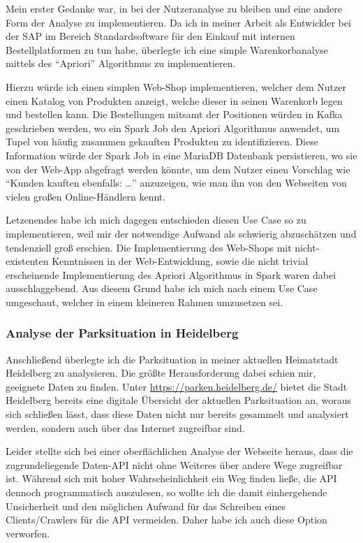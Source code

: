 Mein erster Gedanke war, in bei der Nutzeranalyse zu bleiben und eine andere Form der Analyse zu implementieren.
Da ich in meiner Arbeit als Entwickler bei der SAP im Bereich Standardsoftware für den Einkauf mit internen Bestellplatformen zu tun habe, überlegte ich eine simple Warenkorbanalyse mittels des \enquote{Apriori} Algorithmus zu implementieren.
\parencite{agrawal_fast_1994}

Hierzu würde ich einen simplen Web-Shop implementieren, welcher dem Nutzer einen Katalog von Produkten anzeigt, welche dieser in seinen Warenkorb legen und bestellen kann.
Die Bestellungen mitsamt der Positionen würden in Kafka geschrieben werden, wo ein Spark Job den Apriori Algorithmus anwendet, um Tupel von häufig zusammen gekauften Produkten zu identifizieren.
Diese Information würde der Spark Job in eine MariaDB Datenbank persistieren, wo sie von der Web-App abgefragt werden könnte, um dem Nutzer einen Vorschlag wie \enquote{Kunden kauften ebenfalls:  \ldots} anzuzeigen, wie man ihn von den Webseiten von vielen großen Online-Händlern kennt.

Letzenendes habe ich mich dagegen entschieden diesen Use Case so zu implementieren, weil mir der notwendige Aufwand als schwierig abzuschätzen und tendenziell groß erschien.
Die Implementierung des Web-Shops mit nicht-existenten Kenntnissen in der Web-Entwicklung, sowie die nicht trivial erscheinende Implementierung des Apriori Algorithmus in Spark waren dabei ausschlaggebend.
Aus diesem Grund habe ich mich nach einem Use Case umgeschaut, welcher in einem kleineren Rahmen umzusetzen sei.

\subsubsection{Analyse der Parksituation in Heidelberg}

Anschließend überlegte ich die Parksituation in meiner aktuellen Heimatstadt Heidelberg zu analysieren.
Die größte Herausforderung dabei schien mir, geeignete Daten zu finden.
Unter \url{https://parken.heidelberg.de/} bietet die Stadt Heidelberg bereits eine digitale Übersicht der aktuellen Parksituation an, woraus sich schließen lässt, dass diese Daten nicht nur bereits gesammelt und analysiert werden, sondern auch über das Internet zugreifbar sind.

Leider stellte sich bei einer oberflächlichen Analyse der Webseite heraus, dass die zugrundeliegende Daten-API nicht ohne Weiteres über andere Wege zugreifbar ist.
Während sich mit hoher Wahrscheinlichkeit ein Weg finden ließe, die API dennoch programmatisch auszulesen, so wollte ich die damit einhergehende Unsicherheit und den möglichen Aufwand für das Schreiben eines Clients/Crawlers für die API vermeiden.
Daher habe ich auch diese Option verworfen.

